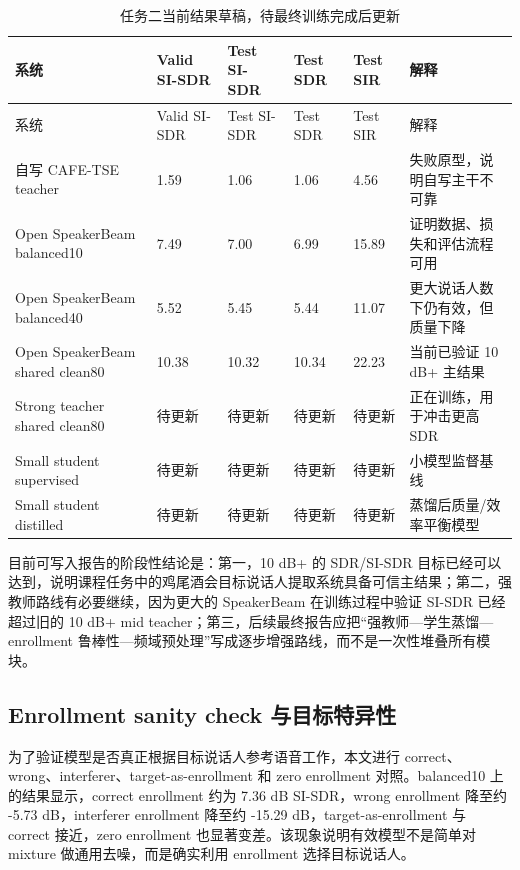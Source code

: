 \documentclass[UTF8,zihao=-4,a4paper]{ctexart}
\begin{document}
\small
\begin{longtable}{@{}p{3.3cm}p{1.45cm}p{1.45cm}p{1.25cm}p{1.25cm}p{3.1cm}@{}}
\caption{任务二当前结果草稿，待最终训练完成后更新}
\label{tab:tse_current_results}\\
\toprule
系统 & Valid SI-SDR & Test SI-SDR & Test SDR & Test SIR & 解释 \\
\midrule
\endfirsthead
\toprule
系统 & Valid SI-SDR & Test SI-SDR & Test SDR & Test SIR & 解释 \\
\midrule
\endhead
自写 CAFE-TSE teacher & 1.59 & 1.06 & 1.06 & 4.56 & 失败原型，说明自写主干不可靠 \\
Open SpeakerBeam balanced10 & 7.49 & 7.00 & 6.99 & 15.89 & 证明数据、损失和评估流程可用 \\
Open SpeakerBeam balanced40 & 5.52 & 5.45 & 5.44 & 11.07 & 更大说话人数下仍有效，但质量下降 \\
Open SpeakerBeam shared clean80 & 10.38 & 10.32 & 10.34 & 22.23 & 当前已验证 10 dB+ 主结果 \\
Strong teacher shared clean80 & 待更新 & 待更新 & 待更新 & 待更新 & 正在训练，用于冲击更高 SDR \\
Small student supervised & 待更新 & 待更新 & 待更新 & 待更新 & 小模型监督基线 \\
Small student distilled & 待更新 & 待更新 & 待更新 & 待更新 & 蒸馏后质量/效率平衡模型 \\
\bottomrule
\end{longtable}
\normalsize

目前可写入报告的阶段性结论是：第一，10 dB+ 的 SDR/SI-SDR 目标已经可以达到，说明课程任务中的鸡尾酒会目标说话人提取系统具备可信主结果；第二，强教师路线有必要继续，因为更大的 SpeakerBeam 在训练过程中验证 SI-SDR 已经超过旧的 10 dB+ mid teacher；第三，后续最终报告应把“强教师—学生蒸馏—enrollment 鲁棒性—频域预处理”写成逐步增强路线，而不是一次性堆叠所有模块。

\subsection{Enrollment sanity check 与目标特异性}

为了验证模型是否真正根据目标说话人参考语音工作，本文进行 correct、wrong、interferer、target-as-enrollment 和 zero enrollment 对照。balanced10 上的结果显示，correct enrollment 约为 7.36 dB SI-SDR，wrong enrollment 降至约 -5.73 dB，interferer enrollment 降至约 -15.29 dB，target-as-enrollment 与 correct 接近，zero enrollment 也显著变差。该现象说明有效模型不是简单对 mixture 做通用去噪，而是确实利用 enrollment 选择目标说话人。
\end{document}
